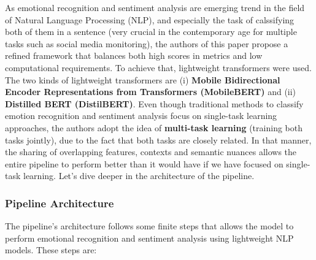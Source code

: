 \documentclass[a4paper,12pt]{article}
\begin{document}
As emotional recognition and sentiment analysis are emerging trend in the field of Natural Language Processing (NLP), and especially the task of calssifying both of them in a sentence (very crucial in the contemporary age for multiple tasks such as social media monitoring), the authors of this paper propose a refined framework that balances both high scores in metrics and low computational requirements.
To achieve that, lightweight transformers were used. The two kinds of lightweight transformers are (i) \textbf{Mobile Bidirectional Encoder Representations from Transformers (MobileBERT)} and (ii) \textbf{Distilled BERT (DistilBERT)}. Even though traditional methods to classify emotion recognition and sentiment analysis focus on single-task learning approaches, the authors adopt the idea of \textbf{multi-task learning} (training both tasks jointly), 
due to the fact that both tasks are closely related. In that manner, the sharing of overlapping features, contexts and semantic nuances allows the entire pipeline to perform better than it would have if we have focused on single-task learning. Let's dive deeper in the architecture of the pipeline.

\subsubsection{Pipeline Architecture}
The pipeline's architecture follows some finite steps that allows the model to perform emotional recognition and sentiment analysis using lightweight NLP models. These steps are:
\end{document}
